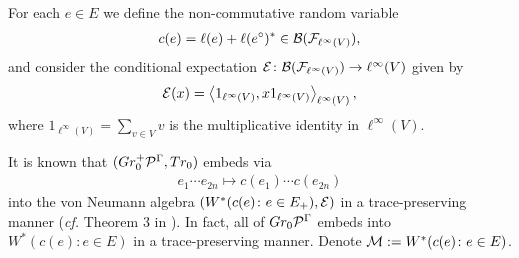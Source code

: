For each $e\in E$ we define the non-commutative random variable
\begin{align*}
c(e)=\ell(e)+\ell(e^\circ)^* \in \mathcal{B}(\mathcal{F}_{\ell^\infty(V)}),
\end{align*}
and consider the conditional expectation $\mathcal{E}\colon \mathcal{B}(\mathcal{F}_{\ell^\infty(V)})\to \ell^\infty(V)$ given by
\begin{align*}
\mathcal{E}(x) = \left\langle1_{\ell^\infty(V)}, x1_{\ell^\infty(V)}\right\rangle_{\ell^\infty(V)},
\end{align*}
where $1_{\ell^\infty(V)}=\sum_{v\in V} v$ is the multiplicative identity in $\ell^\infty(V)$.

It is known that $(Gr_0^+ \mathcal{P}^\Gamma,Tr_0)$ embeds via
\begin{align*}
e_1\cdots e_{2n}\mapsto c(e_1)\cdots c(e_{2n})
\end{align*}
into the von Neumann algebra $(W^*(c(e)\colon e\in E_+), \mathcal{E})$ in a trace-preserving manner (\textit{cf.} Theorem 3 in \cite{GJS10}). In fact, all of $Gr_0\mathcal{P}^\Gamma$ embeds into $W^*(c(e)\colon e\in E)$ in a trace-preserving manner. Denote $\mathcal M:=W^*(c(e)\colon e\in E)$.

